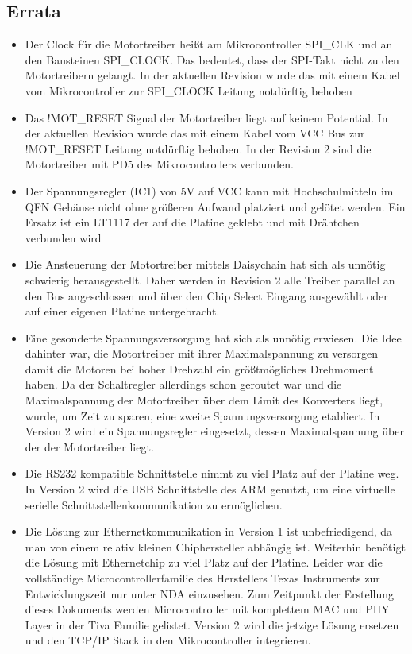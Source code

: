 \documentclass{scrartcl}
\begin{document}
\subsection{Errata}
\begin{itemize}

\item{Der Clock für die Motortreiber heißt am Mikrocontroller SPI\_CLK und an den Bausteinen SPI\_CLOCK. Das bedeutet, dass der SPI-Takt nicht zu den Motortreibern gelangt. In der aktuellen Revision wurde das mit einem Kabel vom Mikrocontroller zur SPI\_CLOCK Leitung notdürftig behoben}

\item{Das !MOT\_RESET Signal der Motortreiber liegt auf keinem Potential. In der aktuellen Revision wurde das mit einem Kabel vom VCC Bus zur !MOT\_RESET Leitung notdürftig behoben. In der Revision 2 sind die Motortreiber mit PD5 des Mikrocontrollers verbunden.}

\item{Der Spannungsregler (IC1) von 5V auf VCC kann mit Hochschulmitteln im QFN Gehäuse nicht ohne größeren Aufwand platziert und gelötet werden. Ein Ersatz ist ein LT1117 der auf die Platine geklebt und mit Drähtchen verbunden wird}


\item{Die Ansteuerung der Motortreiber mittels Daisychain hat sich als unnötig schwierig herausgestellt. Daher werden in Revision 2 alle Treiber parallel an den Bus angeschlossen und über den Chip Select Eingang ausgewählt oder auf einer eigenen Platine untergebracht.}

\item{Eine gesonderte Spannungsversorgung hat sich als unnötig erwiesen. Die Idee dahinter war, die Motortreiber mit ihrer Maximalspannung zu versorgen damit die Motoren bei hoher Drehzahl ein größtmögliches Drehmoment haben. Da der Schaltregler allerdings schon geroutet war und die Maximalspannung der Motortreiber über dem Limit des Konverters liegt, wurde, um Zeit zu sparen, eine zweite Spannungsversorgung etabliert. In Version 2 wird ein Spannungsregler eingesetzt, dessen Maximalspannung über der der Motortreiber liegt.}

\item{Die RS232 kompatible Schnittstelle nimmt zu viel Platz auf der Platine weg. In Version 2 wird die USB Schnittstelle des ARM genutzt, um eine virtuelle serielle Schnittstellenkommunikation zu ermöglichen.}

\item{Die Lösung zur Ethernetkommunikation in Version 1 ist unbefriedigend, da man von einem relativ kleinen Chiphersteller abhängig ist. Weiterhin benötigt die Lösung mit Ethernetchip zu viel Platz auf der Platine. Leider war die vollständige Microcontrollerfamilie des Herstellers Texas Instruments zur Entwicklungszeit nur unter NDA einzusehen. Zum Zeitpunkt der Erstellung dieses Dokuments werden Microcontroller mit komplettem MAC und PHY Layer in der Tiva Familie gelistet. Version 2 wird die jetzige Lösung ersetzen und den TCP/IP Stack in den Mikrocontroller integrieren.}


\end{itemize}
\end{document}
